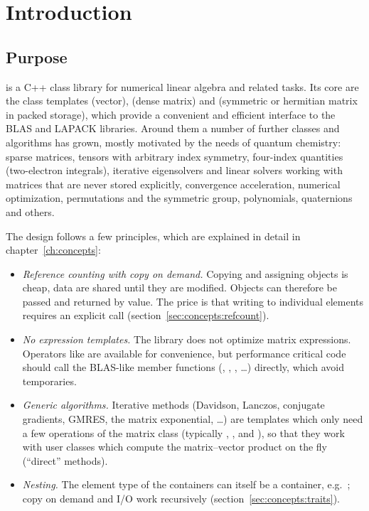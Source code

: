 \chapter{Introduction}\label{ch:introduction}

\section{Purpose}

\LA{} is a C++ class library for numerical linear algebra and related tasks.
Its core are the class templates
 (vector),  (dense matrix) and  (symmetric or hermitian
matrix in packed storage), which provide a convenient and efficient interface to the BLAS and LAPACK
libraries. Around them a number of further classes and algorithms has grown, mostly motivated by the
needs of quantum chemistry: sparse matrices, tensors with arbitrary index symmetry, four-index quantities
(two-electron integrals), iterative eigensolvers and linear solvers working with matrices that are never
stored explicitly, convergence acceleration, numerical optimization, permutations and the symmetric group,
polynomials, quaternions and others.

The design follows a few principles, which are explained in detail in chapter~\ref{ch:concepts}:
\begin{itemize}
\item \emph{Reference counting with copy on demand.} Copying and assigning objects is cheap, data are shared
until they are modified. Objects can therefore be passed and returned by value. The price is that writing to
individual elements requires an explicit  call (section~\ref{sec:concepts:refcount}).
\item \emph{No expression templates.} The library does not optimize matrix expressions. Operators like
 are available for convenience, but performance critical code should call the BLAS-like member
functions (, , , \dots) directly, which avoid temporaries.
\item \emph{Generic algorithms.} Iterative methods (Davidson, Lanczos, conjugate gradients, GMRES, the matrix
exponential, \dots) are templates which only need a few operations of the matrix class (typically
, ,  and ), so that they work with user classes
which compute the matrix--vector product on the fly (``direct'' methods).
\item \emph{Nesting.} The element type of the containers can itself be a container, e.g.\
; copy on demand and I/O work recursively (section~\ref{sec:concepts:traits}).
\end{itemize}

